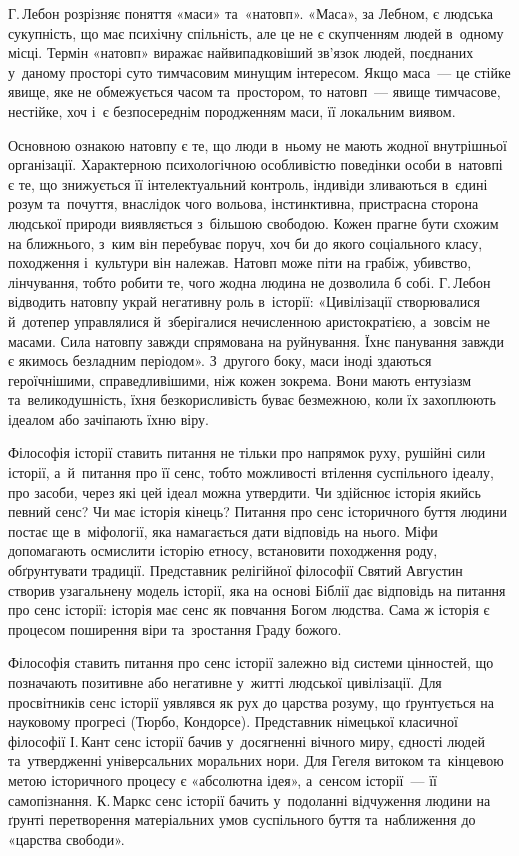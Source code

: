 \documentclass[a5paper,oneside,DIV=12,12pt,headings=small]{scrartcl}
\begin{document}
		Г.\,Лебон розрізняє поняття «маси» та~«натовп». «Маса», за Лебном, є людська сукупність, що має психічну спільність, але це не є скупченням людей в~одному місці. Термін «натовп» виражає найвипадковіший зв'язок людей, поєднаних у~даному просторі суто тимчасовим минущим інтересом. Якщо маса~— це стійке явище, яке не обмежується часом та~простором, то натовп~— явище тимчасове, нестійке, хоч і~є безпосереднім породженням маси, її локальним виявом. 
		
		Основною ознакою натовпу є те, що люди в~ньому не мають жодної внутрішньої організації. Характерною психологічною особливістю поведінки особи в~натовпі є те, що знижується її інтелектуальний контроль, індивіди зливаються в~єдині розум та~почуття, внаслідок чого вольова, інстинктивна, пристрасна сторона людської природи виявляється з~більшою свободою. Кожен прагне бути схожим на ближнього, з~ким він перебуває поруч, хоч би до якого соціального класу, походження і~культури він належав. Натовп може піти на грабіж, убивство, лінчування, тобто робити те, чого жодна людина не дозволила б собі. Г.\,Лебон відводить натовпу украй негативну роль в~історії: «Цивілізації створювалися й~дотепер управлялися й~зберігалися нечисленною аристократією, а~зовсім не масами. Сила натовпу завжди спрямована на руйнування. Їхнє панування завжди є якимось безладним періодом». З~другого боку, маси іноді здаються героїчнішими, справедливішими, ніж кожен зокрема. Вони мають ентузіазм та~великодушність, їхня безкорисливість буває безмежною, коли їх захоплюють ідеалом або зачіпають їхню віру.
		
		Філософія історії ставить питання не тільки про напрямок руху, рушійні сили історії, а~й~питання про її сенс, тобто можливості втілення суспільного ідеалу, про засоби, через які цей ідеал можна утвердити. Чи здійснює історія якийсь певний сенс? Чи має історія кінець? Питання про сенс історичного буття людини постає ще в~міфології, яка намагається дати відповідь на нього. Міфи допомагають осмислити історію етносу, встановити походження роду, обґрунтувати традиції. Представник релігійної філософії Святий Августин створив узагальнену модель історії, яка на основі Біблії дає відповідь на питання про сенс історії: історія має сенс як повчання Богом людства. Сама ж історія є процесом поширення віри та~зростання Граду божого.
		
		Філософія ставить питання про сенс історії залежно від системи цінностей, що позначають позитивне або негативне у~житті людської цивілізації. Для просвітників сенс історії уявлявся як рух до царства розуму, що ґрунтується на науковому прогресі (Тюрбо, Кондорсе). Представник німецької класичної філософії І.\,Кант сенс історії бачив у~досягненні вічного миру, єдності людей та~утвердженні універсальних моральних нори. Для Гегеля витоком та~кінцевою метою історичного процесу є «абсолютна ідея», а~сенсом історії~— її самопізнання. К.\,Маркс сенс історії бачить у~подоланні відчуження людини на ґрунті перетворення матеріальних умов суспільного буття та~наближення до «царства свободи».
		
\end{document}
